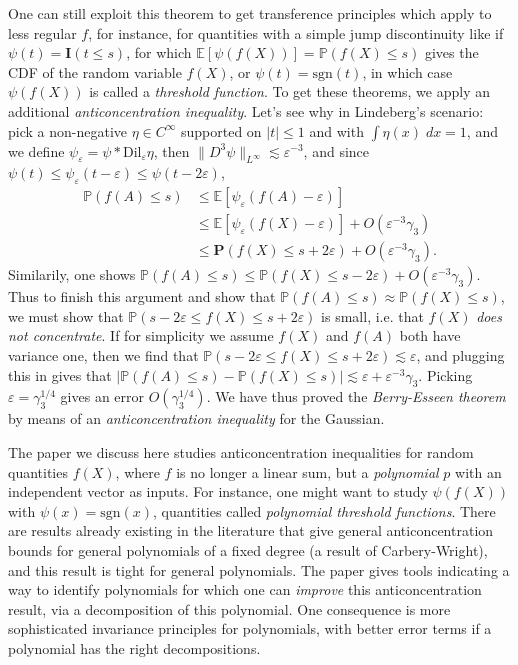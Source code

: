 \documentclass[12pt]{article}
\begin{document}
One can still exploit this theorem to get transference principles which apply to less regular $f$, for instance, for quantities with a simple jump discontinuity like if $\psi(t) = \mathbf{I}(t \leq s)$, for which $\mathbb{E}[\psi(f(X))] = \mathbb{P}(f(X) \leq s)$ gives the CDF of the random variable $f(X)$, or $\psi(t) = \text{sgn}(t)$, in which case $\psi(f(X))$ is called a \emph{threshold function}. To get these theorems, we apply an additional \emph{anticoncentration inequality}. Let's see why in Lindeberg's scenario: pick a non-negative $\eta \in C^\infty$ supported on $|t| \leq 1$ and with $\int \eta(x)\; dx = 1$, and we define $\psi_\varepsilon = \psi * \text{Dil}_\varepsilon \eta$, then $\| D^3 \psi \|_{L^\infty} \lesssim \varepsilon^{-3}$, and since $\psi(t) \leq \psi_\varepsilon(t-\varepsilon) \leq \psi(t - 2\varepsilon)$,
%
\begin{align*}
    \mathbb{P}(f(A) \leq s) &\leq \mathbb{E}[\psi_\varepsilon(f(A)-\varepsilon)]\\
    &\leq \mathbb{E}[\psi_\varepsilon(f(X)-\varepsilon)] + O \left( \varepsilon^{-3} \gamma_3 \right)\\
    &\leq \mathbf{P}(f(X) \leq s + 2\varepsilon) + O(\varepsilon^{-3} \gamma_3).
\end{align*}
%
Similarily, one shows $
\mathbb{P}(f(A) \leq s) \leq \mathbb{P}(f(X) \leq s - 2\varepsilon) + O(\varepsilon^{-3} \gamma_3)$. Thus to finish this argument and show that $\mathbb{P}(f(A) \leq s) \approx \mathbb{P}(f(X) \leq s)$, we must show that $\mathbb{P}(s - 2\varepsilon \leq f(X) \leq s + 2 \varepsilon)$ is small, i.e. that $f(X)$ \emph{does not concentrate}. If for simplicity we assume $f(X)$ and $f(A)$ both have variance one, then we find that $\mathbb{P}(s - 2 \varepsilon \leq f(X) \leq s + 2 \varepsilon) \lesssim \varepsilon$, and plugging this in gives that $|\mathbb{P}(f(A) \leq s) - \mathbb{P}(f(X) \leq s)| \lesssim \varepsilon + \varepsilon^{-3} \gamma_3$. Picking $\varepsilon = \gamma_3^{1/4}$ gives an error $O(\gamma_3^{1/4})$. We have thus proved the \emph{Berry-Esseen theorem} by means of an \emph{anticoncentration inequality} for the Gaussian.

The paper \cite{Kane} we discuss here studies anticoncentration inequalities for random quantities $f(X)$, where $f$ is no longer a linear sum, but a \emph{polynomial} $p$ with an independent vector as inputs. For instance, one might want to study $\psi(f(X))$ with $\psi(x) = \text{sgn}(x)$, quantities called \emph{polynomial threshold functions}. There are results already existing in the literature that give general anticoncentration bounds for general polynomials of a fixed degree (a result of Carbery-Wright), and this result is tight for general polynomials. The paper \cite{Kane} gives tools indicating a way to identify polynomials for which one can \emph{improve} this anticoncentration result, via a decomposition of this polynomial. One consequence is more sophisticated invariance principles for polynomials, with better error terms if a polynomial has the right decompositions.
\end{document}

